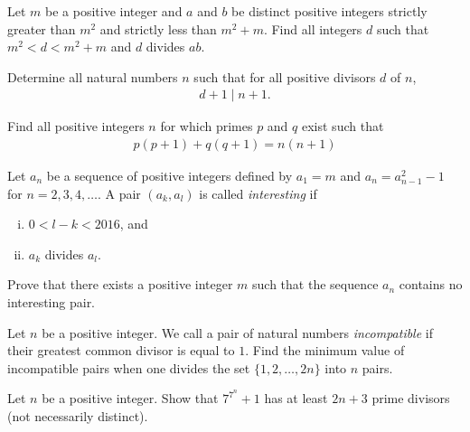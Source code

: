 \documentclass[problems.tex]{subfile}
\begin{document}
	
	
	\begin{problem}
		Let $m$ be a positive integer and $a$ and $b$ be distinct positive integers strictly greater than $m^2$ and strictly less than $m^2+m$. Find all integers $d$ such that $m^2 < d < m^2+m$ and $d$ divides $ab$. %
	\end{problem}
	
	
	
	
	\begin{problem}
		Determine all natural numbers $n$ such that for all positive divisors $d$ of $n$,
		\begin{align*}
			d + 1 \mid n + 1.
		\end{align*}
	\end{problem}
	
	
	
	\begin{problem}
		Find all positive integers $n$ for which primes $p$ and $q$ exist such that
		\begin{align*}
			p(p+1) + q(q+1) = n(n+1)
		\end{align*}
	\end{problem}
	
	
	\begin{problem}
		Let $a_n$ be a sequence of positive integers defined by $a_1 = m$ and $a_{n} = a_{n-1}^2 - 1$ for $n= 2, 3, 4, \dots$. A pair $(a_k, a_l)$ is called \textit{interesting} if
		\begin{enumerate}[(i)]
			\item $0 < l - k < 2016$, and
			\item $a_k$ divides $a_l$.
		\end{enumerate}
		Prove that there exists a positive integer $m$ such that the sequence $a_n$ contains no interesting pair.
	\end{problem}
	
	
	\begin{problem}
		Let $n$ be a positive integer. We call a pair of natural numbers \textit{incompatible} if their greatest common divisor is equal to $1$. Find the minimum value of incompatible pairs when one divides the set $\{1,2,\dots,2n\}$ into $n$ pairs.
	\end{problem}
	
	
	\begin{problem}
		Let $n$ be a positive integer. Show that $7^{7^n} + 1$ has at least $2n + 3$ prime divisors (not necessarily distinct).
	\end{problem}
	
\end{document}
